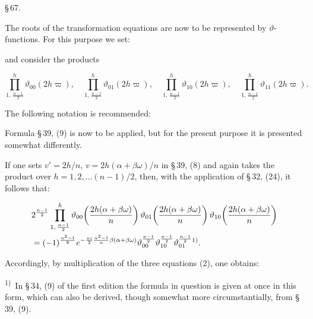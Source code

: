 \begin{center}
\S\,67. \textbf{}
\end{center}

The roots of the transformation equations are now to be represented by $\vartheta$-functions. For this purpose we set:


and consider the products

\[
\prod_{1,\,\frac{n-1}{2}}^{h} \vartheta_{00}(2h\varpi), \quad
\prod_{1,\,\frac{n-1}{2}}^{h} \vartheta_{01}(2h\varpi), \quad
\prod_{1,\,\frac{n-1}{2}}^{h} \vartheta_{10}(2h\varpi), \quad
\prod_{1,\,\frac{n-1}{2}}^{h} \vartheta_{11}(2h\varpi).
\]

The following notation is recommended:


Formula \S\,39, (9) is now to be applied, but for the present purpose it is presented somewhat differently.

If one sets $v' = 2h/n$, $v = 2h(\alpha+\beta\omega)/n$ in \S\,39, (8) and again takes the product over $h = 1, 2, \ldots (n-1)/2$, then, with the application of \S\,32, (24), it follows that:

\[
\begin{aligned}
&2^{\frac{n-1}{2}} \prod_{1,\,\frac{n-1}{2}}^{h} \vartheta_{00}\!\left(\frac{2h(\alpha+\beta\omega)}{n}\right) \vartheta_{01}\!\left(\frac{2h(\alpha+\beta\omega)}{n}\right) \vartheta_{10}\!\left(\frac{2h(\alpha+\beta\omega)}{n}\right)\\
&= (-1)^{\frac{n^2-1}{8}} e^{-\frac{\pi i}{2}\frac{n^2-1}{n}\beta(\alpha+\beta\omega)} \vartheta_{00}^{\frac{n-1}{2}} \vartheta_{10}^{\frac{n-1}{2}} \vartheta_{01}^{\frac{n-1}{2}}\textsuperscript{1)}.
\end{aligned}
\]

Accordingly, by multiplication of the three equations (2), one obtains:


\textsuperscript{1)}~In \S\,34, (9) of the first edition the formula in question is given at once in this form, which can also be derived, though somewhat more circumstantially, from \S\,39, (9).

